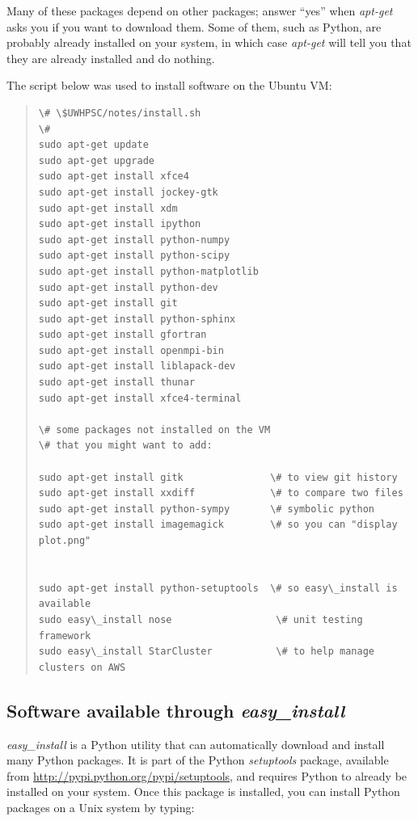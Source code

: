 \documentclass[letterpaper,10pt,english]{sphinxmanual}
\begin{document}
Many of these packages depend on other packages; answer ``yes'' when
\emph{apt-get} asks you if you want to download them.  Some of them, such
as Python, are probably already installed on your system, in which
case \emph{apt-get} will tell you that they are already installed and do
nothing.

The script below was used to install software on the Ubuntu VM:
\begin{quote}

\begin{Verbatim}[commandchars=\\\{\}]
\# \$UWHPSC/notes/install.sh
\# 
sudo apt-get update
sudo apt-get upgrade
sudo apt-get install xfce4
sudo apt-get install jockey-gtk
sudo apt-get install xdm
sudo apt-get install ipython
sudo apt-get install python-numpy
sudo apt-get install python-scipy
sudo apt-get install python-matplotlib
sudo apt-get install python-dev
sudo apt-get install git
sudo apt-get install python-sphinx
sudo apt-get install gfortran
sudo apt-get install openmpi-bin
sudo apt-get install liblapack-dev
sudo apt-get install thunar
sudo apt-get install xfce4-terminal

\# some packages not installed on the VM 
\# that you might want to add:

sudo apt-get install gitk               \# to view git history
sudo apt-get install xxdiff             \# to compare two files
sudo apt-get install python-sympy       \# symbolic python
sudo apt-get install imagemagick        \# so you can "display plot.png"


sudo apt-get install python-setuptools  \# so easy\_install is available
sudo easy\_install nose                  \# unit testing framework
sudo easy\_install StarCluster           \# to help manage clusters on AWS
\end{Verbatim}
\end{quote}


\subsection{Software available through \emph{easy\_install}}
\label{software_installation:easy-install}\label{software_installation:software-available-through-easy-install}
\emph{easy\_install} is a Python utility that can automatically download and
install many Python packages.  It is part of the Python \emph{setuptools}
package, available from \href{http://pypi.python.org/pypi/setuptools}{http://pypi.python.org/pypi/setuptools},
and requires Python to already be installed on your system.  Once this
package is installed, you can install Python packages on a Unix system
by typing:
\end{document}
